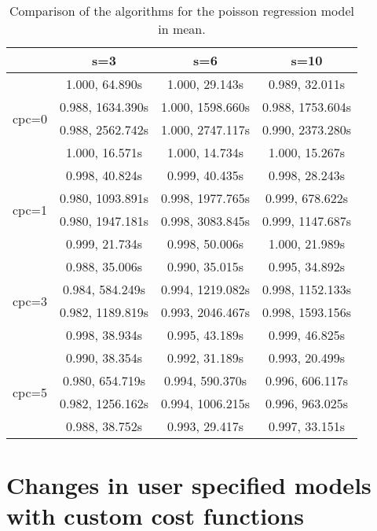 \documentclass[article]{jss}
\begin{document}
\begin{table}[t!]
  \centering
  \begin{tabular}{@{}cccc@{}}
  \toprule
                         & s=3                               & s=6                               & s=10                               \\ \midrule
  \multirow{4}{*}{cpc=0} & 1.000, 64.890s & 1.000, 29.143s & 0.989, 32.011s \\
                         & 0.988, 1634.390s & 1.000, 1598.660s & 0.988, 1753.604s \\
                         & 0.988, 2562.742s & 1.000, 2747.117s & 0.990, 2373.280s \\
                         & 1.000, 16.571s & 1.000, 14.734s & 1.000, 15.267s \\ \midrule
  \multirow{4}{*}{cpc=1} & 0.998, 40.824s & 0.999, 40.435s & 0.998, 28.243s \\
                         & 0.980, 1093.891s & 0.998, 1977.765s & 0.999, 678.622s \\
                         & 0.980, 1947.181s & 0.998, 3083.845s & 0.999, 1147.687s \\
                         & 0.999, 21.734s & 0.998, 50.006s & 1.000, 21.989s \\ \midrule
  \multirow{4}{*}{cpc=3} & 0.988, 35.006s & 0.990, 35.015s & 0.995, 34.892s \\
                         & 0.984, 584.249s & 0.994, 1219.082s & 0.998, 1152.133s \\
                         & 0.982, 1189.819s & 0.993, 2046.467s & 0.998, 1593.156s \\
                         & 0.998, 38.934s & 0.995, 43.189s & 0.999, 46.825s \\ \midrule
  \multirow{4}{*}{cpc=5} & 0.990, 38.354s & 0.992, 31.189s & 0.993, 20.499s \\
                         & 0.980, 654.719s & 0.994, 590.370s & 0.996, 606.117s \\
                         & 0.982, 1256.162s & 0.994, 1006.215s & 0.996, 963.025s \\
                         & 0.988, 38.752s & 0.993, 29.417s & 0.997, 33.151s \\ \bottomrule
  \end{tabular}
  \caption{\label{tab:poisson regression comparison} Comparison of the algorithms for the poisson regression model in mean.}
\end{table}

\section{Changes in user specified models with custom cost functions} \label{sec:custom}
\end{document}
